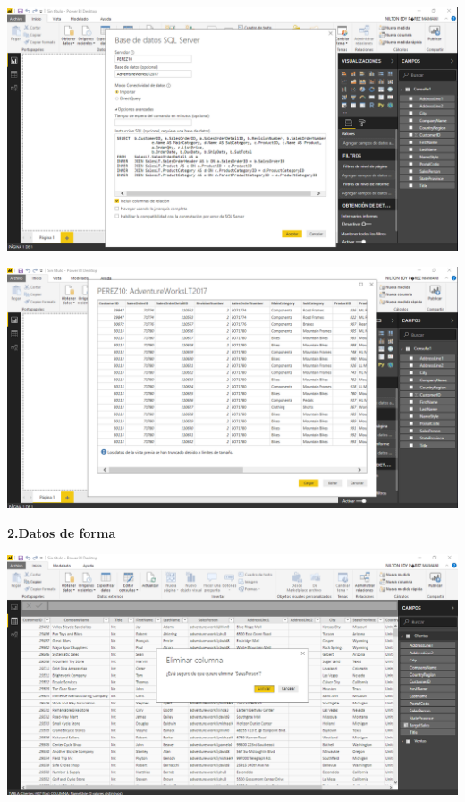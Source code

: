 \begin{center}
\includegraphics[width=15cm]{./Imagenes/imagen5}
\end{center}

\begin{center}
\includegraphics[width=15cm]{./Imagenes/imagen6}
\end{center}

\textbf{2.Datos de forma}

\begin{center}
\includegraphics[width=15cm]{./Imagenes/imagen7}
\end{center}

